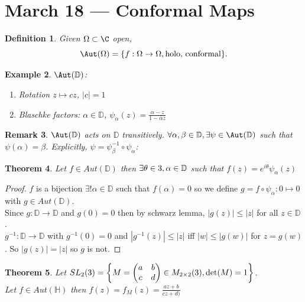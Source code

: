 \documentclass[a4paper]{article}
\newtheorem{thm}{Theorem}[section]
\newtheorem{defn}[thm]{Definition}
\newtheorem{eg}[thm]{Example}
\newtheorem{rmk}[thm]{Remark}
\begin{document}
\section{March 18 --- Conformal Maps}
\begin{defn}
    Given $\Omega\subset \C$ open, \[
    \Aut(\Omega)= \{f:\Omega\to \Omega, \text{holo, conformal}\}
    .\] 
\end{defn}
\begin{eg}
    $\Aut(\mathbb{D})$: 
    \begin{enumerate}
        \item Rotation $z\mapsto cz$, $|c|=1$
        \item Blaschke factors: $\alpha\in \mathbb{D}$, $\psi_\alpha(z)=\frac{\alpha-z}{1-\overline{\alpha}z}$
    \end{enumerate}
\end{eg}
\begin{rmk}
    $\Aut(\mathbb{D})$ acts on $\mathbb{D}$ transitively. $\forall \alpha, \beta\in \mathbb{D}, \exists \psi\in \Aut(\mathbb{D})$ such that $\psi(\alpha)=\beta$. Explicitly, $\psi = \psi_\beta^{-1} \circ \psi_\alpha$:
    \begin{center}
    \end{center}
\end{rmk}
\begin{thm}
    Let $f\in Aut(\mathbb{D})$ then $\exists \theta\in 3, \alpha\in \mathbb{D}$ such that $f(z)=e^{i\theta} \psi_\alpha(z)$
\end{thm}
\begin{proof}
    $f$ is a bijection $\exists ! \alpha\in \mathbb{D}$ such that $f(\alpha)=0$ so we define $g=f\circ \psi_\alpha:0\mapsto 0$ with $g\in Aut(\mathbb{D})$. \\
    Since $g:\mathbb{D}\to \mathbb{D}$ and $g(0)=0$ then by schwarz lemma, 
    $|g(z)|\leq |z|$ for all $z\in \mathbb{D}$. \\
    $g^{-1}:\mathbb{D}\to\mathbb{D}$ with $g^{-1}(0)=0$ and $|g^{-1}(z)|\leq |z|$ iff $|w|\leq |g(w)|$ for $z=g(w)$. So $|g(z)|=|z|$ so $g$ is not. 
\end{proof}
\begin{thm}
    Let $SL_2(3)= \left\{M=\begin{pmatrix}
        a & b \\
        c & d
    \end{pmatrix}\in M_{2\times 2}(3), \det(M)=1\right\}$. \\
    Let $f\in Aut(\mathbb{H})$ then $f(z)=f_M(z)=\frac{az+b}{cz+d)}$
\end{thm}
\end{document}
